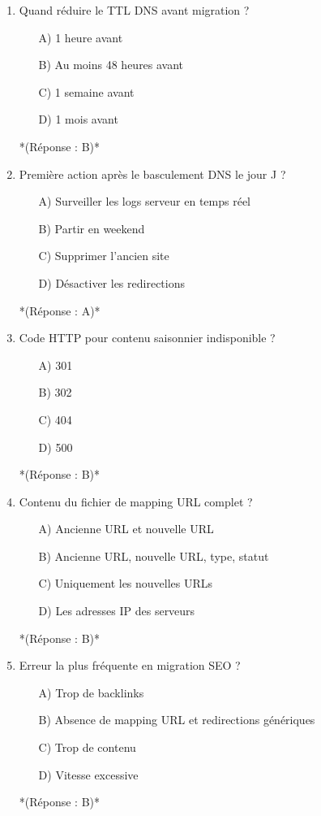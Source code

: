 \documentclass[12pt,a4paper,twoside]{report}
\begin{document}
\begin{enumerate}
\item Quand réduire le TTL DNS avant migration ?
\begin{itemize}
\item[A)] 1 heure avant
\item[B)] Au moins 48 heures avant
\item[C)] 1 semaine avant
\item[D)] 1 mois avant
\end{itemize}
*(Réponse : B)*

\item Première action après le basculement DNS le jour J ?
\begin{itemize}
\item[A)] Surveiller les logs serveur en temps réel
\item[B)] Partir en weekend
\item[C)] Supprimer l'ancien site
\item[D)] Désactiver les redirections
\end{itemize}
*(Réponse : A)*

\item Code HTTP pour contenu saisonnier indisponible ?
\begin{itemize}
\item[A)] 301
\item[B)] 302
\item[C)] 404
\item[D)] 500
\end{itemize}
*(Réponse : B)*

\item Contenu du fichier de mapping URL complet ?
\begin{itemize}
\item[A)] Ancienne URL et nouvelle URL
\item[B)] Ancienne URL, nouvelle URL, type, statut
\item[C)] Uniquement les nouvelles URLs
\item[D)] Les adresses IP des serveurs
\end{itemize}
*(Réponse : B)*

\item Erreur la plus fréquente en migration SEO ?
\begin{itemize}
\item[A)] Trop de backlinks
\item[B)] Absence de mapping URL et redirections génériques
\item[C)] Trop de contenu
\item[D)] Vitesse excessive
\end{itemize}
*(Réponse : B)*


\end{enumerate}
\end{document}
